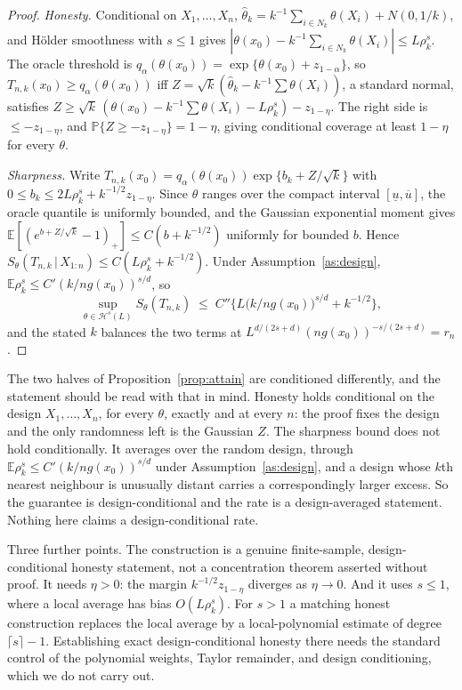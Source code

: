 \documentclass[11pt]{article}
\theoremstyle{definition}
\theoremstyle{remark}
\newcommand{\E}{\mathbb{E}}
\newcommand{\Prob}{\mathbb{P}}
\newcommand{\Hs}[1][s]{\mathcal{H}^{#1}}
\newcommand{\given}{\,|\,}
\begin{document}
\begin{proof}
\emph{Honesty.} Conditional on $X_1,\dots,X_n$, $\widehat\theta_k = k^{-1}\sum_{i\in
N_k}\theta(X_i) + N(0,1/k)$, and H\"older smoothness with $s\le1$ gives
$|\theta(x_0)-k^{-1}\sum_{i\in N_k}\theta(X_i)| \le L\rho_k^{s}$. The oracle threshold is
$q_\alpha(\theta(x_0))=\exp\{\theta(x_0)+z_{1-\alpha}\}$, so $T_{n,k}(x_0)\ge
q_\alpha(\theta(x_0))$ iff $Z=\sqrt k(\widehat\theta_k-k^{-1}\sum\theta(X_i))$, a standard
normal, satisfies $Z \ge \sqrt k\,(\theta(x_0)-k^{-1}\sum\theta(X_i)-L\rho_k^{s}) -
z_{1-\eta}$. The right side is $\le -z_{1-\eta}$, and $\Prob\{Z\ge -z_{1-\eta}\}=1-\eta$,
giving conditional coverage at least $1-\eta$ for every $\theta$.

\emph{Sharpness.} Write $T_{n,k}(x_0)=q_\alpha(\theta(x_0))\exp\{b_k+Z/\sqrt k\}$ with
$0\le b_k \le 2L\rho_k^{s}+k^{-1/2}z_{1-\eta}$. Since $\theta$ ranges over the compact
interval $[\underline u,\overline u]$, the oracle quantile is uniformly bounded, and the
Gaussian exponential moment gives $\E[(e^{b+Z/\sqrt k}-1)_+]\le C(b+k^{-1/2})$ uniformly for
bounded $b$. Hence $S_\theta(T_{n,k}\given X_{1:n}) \le C(L\rho_k^{s}+k^{-1/2})$. Under
Assumption~\ref{as:design}, $\E\rho_k^{s}\le C'(k/n g(x_0))^{s/d}$, so
\[
  \sup_{\theta\in\Hs(L)} S_\theta(T_{n,k})
    \;\le\; C''\Big\{ L\big(k/n g(x_0)\big)^{s/d} + k^{-1/2} \Big\},
\]
and the stated $k$ balances the two terms at $L^{d/(2s+d)}(n g(x_0))^{-s/(2s+d)}=r_n$.
\end{proof}

The two halves of Proposition~\ref{prop:attain} are conditioned differently, and the
statement should be read with that in mind. Honesty holds conditional on the design
$X_1,\dots,X_n$, for every $\theta$, exactly and at every $n$: the proof fixes the design and
the only randomness left is the Gaussian $Z$. The sharpness bound does not hold conditionally.
It averages over the random design, through $\E\rho_k^{s}\le C'(k/n g(x_0))^{s/d}$ under
Assumption~\ref{as:design}, and a design whose $k$th nearest neighbour is unusually distant
carries a correspondingly larger excess. So the guarantee is design-conditional and the rate
is a design-averaged statement. Nothing here claims a design-conditional rate.

Three further points. The construction is a genuine finite-sample, design-conditional honesty
statement, not a concentration theorem asserted without proof. It needs $\eta>0$: the
margin $k^{-1/2}z_{1-\eta}$ diverges as $\eta\to0$. And it uses $s\le1$, where a local
average has bias $O(L\rho_k^{s})$. For $s>1$ a matching honest construction replaces the
local average by a local-polynomial estimate of degree $\lceil s\rceil-1$. Establishing
exact design-conditional honesty there needs the standard control of the polynomial
weights, Taylor remainder, and design conditioning, which we do not carry out.
\end{document}
